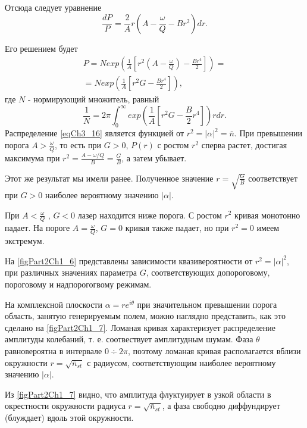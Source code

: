 Отсюда следует уравнение
\begin{equation}
\frac{d P}{P} = 
\frac{2}{A} r \left(A - \frac{\omega}{Q} - B r^2\right)d r. 
\label{eqCh3_15}
\end{equation}

Его решением будет
\begin{eqnarray}
P = N exp \left(\frac{1}{A}
\left[
r^2 \left(A - \frac{\omega}{Q}\right)
 - 
\frac{B r^4}{2}
\right]
\right) = 
\nonumber \\
= 
N exp \left(\frac{1}{A}
\left[
r^2 G
 - 
\frac{B r^4}{2}
\right]
\right),
\label{eqCh3_16}
\end{eqnarray}
где $N$ - нормирующий множитель, равный
\[
\frac{1}{N} = 2 \pi \int_0^{\infty}
exp\left(
\frac{1}{A}\left[
r^2 G - \frac{B}{2}r^4
\right]
\right)
r dr.
\]
Распределение \eqref{eqCh3_16}
является функцией от $r^2 = \left|\alpha\right|^2 = \bar{n}$. При
превышении порога $A > \frac{\omega}{Q}$,  то есть при $G > 0$,
$P\left(r\right)$ с ростом $r^2$ сперва растет, достигая максимума при
$r^2 = \frac{A - \omega/Q}{B} = \frac{G}{B}$, а затем убывает.  

Этот же результат мы имели ранее. Полученное значение $r =
\sqrt{\frac{G}{B}}$ соответствует при $G > 0$ наиболее вероятному
значению $\left|\alpha\right|$.
  
При $A < \frac{\omega}{Q}$ , $G < 0$ лазер находится ниже порога. С
ростом $r^2$ кривая монотонно падает. На пороге $A =
\frac{\omega}{Q}$,  $G = 0$  кривая также падает, но при $r^2 = 0$
имеем экстремум.   



На \autoref{figPart2Ch1_6} представлены зависимости квазивероятности от $r^2 =
\left|\alpha\right|^2$, при различных значениях параметра $G$,
соответствующих допороговому, пороговому и надпорогогвому режимам. 

На комплексной плоскости $\alpha = r e^{i \theta}$ при значительном
превышении порога область, занятую генерируемым полем, можно наглядно
представить, как это сделано на
\autoref{figPart2Ch1_7}. Ломаная кривая характеризует
распределение амплитуды колебаний, т. е. соотвествует амплитудным 
шумам. Фаза $\theta$ равновероятна в интервале  $0 \div 2\pi$,
поэтому ломаная кривая располагается вблизи окружности $r =
\sqrt{\bar{n}_{st}}$ с радиусом, соответствующим наиболее вероятному
значению $\left|\alpha\right|$. 



Из \autoref{figPart2Ch1_7} видно, что амплитуда флуктуирует в узкой области в
окрестности окружности радиуса $r = \sqrt{\bar{n}_{st}}$,  а фаза
свободно диффундирует (блуждает) вдоль этой окружности. 

